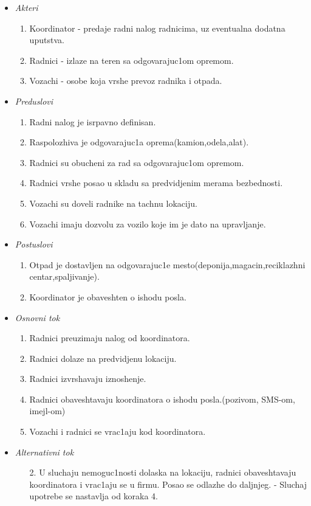 \documentclass[10 pt]{article}
\begin{document}
	\begin{itemize}
		\label{OsnovniSlucaj}
		\item\textit{Akteri}
			\begin{enumerate}
				\item Koordinator - predaje radni nalog radnicima, uz eventualna dodatna uput{s}tva.
				\item Radnici - izlaze na teren sa odgovarajuc1om opremom.
				\item Vozachi - osobe koja vrshe prevoz radnika i otpada.
			\end{enumerate}		
			
		\item\textit{Preduslovi}
			\begin{enumerate}
				\item Radni nalog je isrpavno definisan.
				\item Raspolozhiva je odgovarajuc1a oprema(kamion,odela,alat).
				\item Radnici su obucheni za rad sa odgovarajuc1om opremom.
				\item Radnici vrshe posao u skladu sa predvidjenim merama bezbednosti.
				\item Vozachi su doveli radnike na tachnu lokaciju.
				\item Vozachi imaju dozvolu za vozilo koje im je dato na upravljanje.
			\end{enumerate}
		
		\item\textit{Postuslovi}
			\begin{enumerate}
				\item Otpad je dostavljen na odgovarajuc1e mesto(deponija,magacin,reciklazhni centar,spaljivanje).
				\item Koordinator je obaveshten o is{h}odu posla.
			\end{enumerate}
		
		\item\textit{Osnovni tok}
			\begin{enumerate}
				\item Radnici preuzimaju nalog od koordinatora.
				\item Radnici dolaze na predvidjenu lokaciju.
				\item Radnici izvrshavaju iznoshenje.
				\item Radnici obaveshtavaju koordinatora o is{h}odu posla.(pozivom, SMS-om, imejl-om)
				\item Vozachi i radnici se vrac1aju kod koordinatora.
			\end{enumerate}
		
		\item\textit{Alternativni tok}
			\begin{enumerate}
				\item [2.] U sluchaju nemoguc1nosti dolaska na lokaciju, radnici obaveshtavaju koordinatora i vrac1aju se u firmu. Posao se odlazhe do daljnjeg. - Sluchaj upotrebe se nastavlja od koraka 4. 
			\end{enumerate}
			
	\end{itemize}		
	
\end{document}
